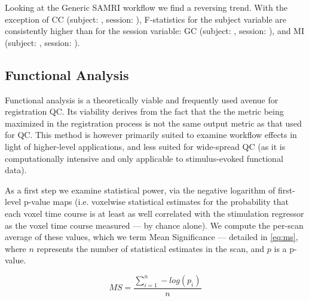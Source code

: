 Looking at the Generic SAMRI workflow we find a reversing trend.
With the exception of CC (subject: , session: ), F-statistics for the subject variable are consistently higher than for the session variable:
GC (subject: , session: ),
and MI (subject: , session: ).


\subsection{Functional Analysis}

Functional analysis is a theoretically viable and frequently used avenue for registration QC.
Its viability derives from the fact that the the metric being maximized in the registration process is not the same output metric as that used for QC.
This method is however primarily suited to examine workflow effects in light of higher-level applications, and less suited for wide-spread QC (as it is computationally intensive and only applicable to stimulus-evoked functional data).

As a first step we examine statistical power, via the negative logarithm of first-level p-value maps (i.e. voxelwise statistical estimates for the probability that each voxel time course is at least as well correlated with the stimulation regressor as the voxel time course measured --- by chance alone).
We compute the per-scan average of these values, which we term Mean Significance --- detailed in \cref{eq:ms}, where $n$ represents the number of statistical estimates in the scan, and $p$ is a p-value.

\begin{equation} \label{eq:ms}
        M\!S = \frac{\sum_{i=1}^n -log(p_i)}{n}
\end{equation}

